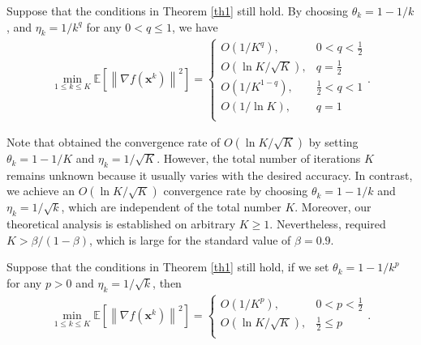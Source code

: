 \documentclass[twoside,11pt]{article}
\begin{document}
\begin{corollary}\label{Ergcor}
Suppose that the conditions in Theorem \ref{th1} still hold. By choosing $\theta_k=1-1/k$, and $\eta_k=1/k^q$ for any $0<q\le 1$, we have 
\begin{equation}\label{equation2.49}
    \begin{aligned}
	\min_{1\le k\le K}\mathbb{E}\left[\left\| \nabla f(\mathbf{x}^k)\right\|^2\right]=
	\begin{cases}
	O(1/K^{q}) ,
	& \text{$0<q< \frac{1}{2}$}\\
	O(\ln K/\sqrt{K}), 
	& \text{$q=\frac{1}{2}$}\\
	O(1/K^{1-q}) ,
	& \text{$\frac{1}{2}<q<1$}\\
	O(1/\ln K) ,
	& \text{$q=1$}\\
\end{cases}.\nonumber
\end{aligned}
\end{equation}
\end{corollary}
\par Note that \citet{defossezsimple} obtained the convergence rate of $O(\ln K/\sqrt{K})$ by setting $\theta_k=1-1/K$ and $\eta_k=1/\sqrt{K}$. However, the total number of iterations $K$ remains unknown because it usually varies with the desired accuracy. In contrast, we achieve an $O(\ln K/\sqrt{K}) $ convergence rate by choosing $\theta_k=1-1/k$ and $\eta_k=1/\sqrt{k}$, which are independent of the total number $K$. Moreover, our theoretical analysis is established on arbitrary $K\ge 1$. Nevertheless, \citet{defossezsimple} required $K>\beta/(1-\beta)$, which is large for the standard value of $\beta=0.9$.

\begin{corollary}\label{Ergcor3}
Suppose that the conditions in Theorem \ref{th1} still hold, if we set $\theta_k=1-1/k^{p}$ for any $p>0$ and $\eta_k=1/\sqrt{k}$, then
\begin{equation}
	\begin{aligned}
	\min_{1\le k\le K}\mathbb{E}\left[\left\| \nabla f(\mathbf{x}^k)\right\|^2\right]=
	\begin{cases}
	O(1/K^{p}) ,
	& \text{$0<p< \frac{1}{2}$}\\
	O(\ln K/\sqrt{K}), 
	& \text{$\frac{1}{2}\le p$}\\
	\end{cases}.\nonumber
	\end{aligned}	
\end{equation}
\end{corollary}
\end{document}
